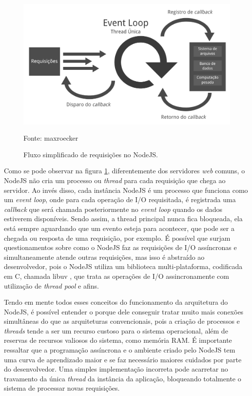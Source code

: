 \begin{figure}[!htb]
	\centering
	\includegraphics[scale=0.55]{imagens/node-eventloop.png}
	\caption{\small Fluxo simplificado de requisições no NodeJS.} Fonte: maxroecker \cite{img-eventloop}
	\label{fig:node-eventloop}
\end{figure}

Como se pode observar na figura \ref{fig:node-eventloop}, diferentemente dos servidores \textit{web} comuns, o NodeJS não cria um processo ou \textit{thread} para cada requisição que chega ao servidor. Ao invés disso, cada instância NodeJS é um processo que funciona como um \textit{event loop}, onde para cada operação de I/O requisitada, é registrada uma \textit{callback} que será chamada posteriormente no \textit{event loop} quando os dados estiverem disponíveis. Sendo assim, a thread principal nunca fica bloqueada, ela está sempre aguardando que um evento esteja para acontecer, que pode ser a chegada ou resposta de uma requisição, por exemplo. É possível que surjam questionamentos sobre como o NodeJS faz as requisições de I/O assíncronas e simultaneamente atende outras requisições, mas isso é abstraído ao desenvolvedor, pois o NodeJS utiliza um biblioteca multi-plataforma, codificada em C, chamada libuv \cite{libuv}, que trata as operações de I/O assincronamente com utilização de \textit{thread pool} e afins.

Tendo em mente todos esses conceitos do funcionamento da arquitetura do NodeJS, é possível entender o porque dele conseguir tratar muito mais conexões simultâneas do que as arquiteturas convencionais, pois a criação de processos e \textit{threads} tende a ser um recurso custoso para o sistema operacional, além de reservas de recursos valiosos do sistema, como memória RAM. É importante ressaltar que a programação assíncrona e o ambiente criado pelo NodeJS tem uma curva de aprendizado maior e se faz necessário maiores cuidados por parte do desenvolvedor. Uma simples implementação incorreta pode acarretar no travamento da única \textit{thread} da instância da aplicação, bloqueando totalmente o sistema de processar novas requisições. 

